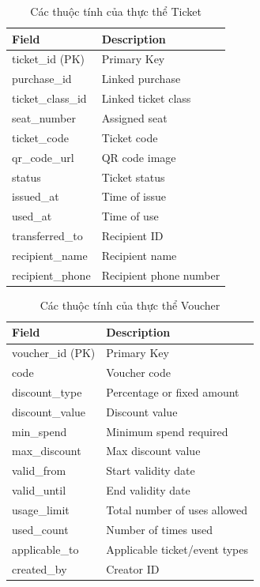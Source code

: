 \begin{table}[H]
\centering
\begin{tabular}{|p{4.5cm}|p{6cm}|}
\hline
\textbf{Field} & \textbf{Description} \\ \hline
ticket\_id (PK) & Primary Key \\ \hline
purchase\_id & Linked purchase \\ \hline
ticket\_class\_id & Linked ticket class \\ \hline
seat\_number & Assigned seat \\ \hline
ticket\_code & Ticket code \\ \hline
qr\_code\_url & QR code image \\ \hline
status & Ticket status \\ \hline
issued\_at & Time of issue \\ \hline
used\_at & Time of use \\ \hline
transferred\_to & Recipient ID \\ \hline
recipient\_name & Recipient name \\ \hline
recipient\_phone & Recipient phone number \\ \hline
\end{tabular}
\vspace{15pt}
\caption{Các thuộc tính của thực thể Ticket}
\end{table}

\begin{table}[H]
\centering
\begin{tabular}{|p{4.5cm}|p{6cm}|}
\hline
\textbf{Field} & \textbf{Description} \\ \hline
voucher\_id (PK) & Primary Key \\ \hline
code & Voucher code \\ \hline
discount\_type & Percentage or fixed amount \\ \hline
discount\_value & Discount value \\ \hline
min\_spend & Minimum spend required \\ \hline
max\_discount & Max discount value \\ \hline
valid\_from & Start validity date \\ \hline
valid\_until & End validity date \\ \hline
usage\_limit & Total number of uses allowed \\ \hline
used\_count & Number of times used \\ \hline
applicable\_to & Applicable ticket/event types \\ \hline
created\_by & Creator ID \\ \hline
\end{tabular}
\vspace{15pt}
\caption{Các thuộc tính của thực thể Voucher}
\end{table}

